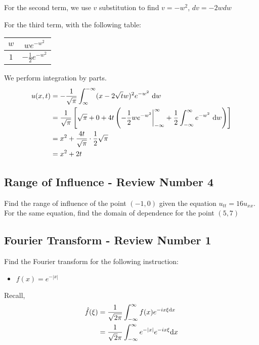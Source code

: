 For the second term, we use $v$ substitution to find $v = -w^2$, $dv = -2w dw$

For the third term, with the following table:
%
\begin{center}
  \begin{tabular}{c|c}
    $w$ & $we^{-w^2}$\\
    \hline
    $1$ & $-\frac{1}{2} e^{-w^2}$
  \end{tabular}
\end{center}

We perform integration by parts.
%
\begin{align}
  u(x, t) & = - \frac{1}{\sqrt \pi} \int^{-\infty}_{\infty} (x - 2 \sqrt t w)^2 e^{-w^2}\ \text dw\\
  & = \frac{1}{\sqrt \pi}
  \left[
  \sqrt \pi
  + 0
  + 4t
  \left(
  -\frac{1}{2} we^{-w^2} \bigg|^\infty_{-\infty} + \frac{1}{2} \int^\infty_{-\infty} e^{-w^2}\ \text dw
  \right)
  \right]\\
  & = x^2 + \frac{4t}{\sqrt \pi} \cdot \frac{1}{2} \sqrt \pi\\
  & = x^2 + 2t
\end{align}

\subsection*{Range of Influence - Review Number 4}

Find the range of influence of the point $(-1, 0)$ given the equation $u_{tt} = 16u_{xx}$. For the same equation, find the domain of dependence for the point $(5, 7)$

\subsection*{Fourier Transform - Review Number 1}

Find the Fourier transform for the following instruction:
%
\begin{itemize}
  \item $f(x) = e^{-|x|}$
\end{itemize}

Recall,
%
\begin{align}
  \hat f(\xi) & = \frac{1}{\sqrt{2\pi}} \int^\infty_{-\infty} f(x) e^{-i x \xi \text dx}\\
  & = \frac{1}{\sqrt 2 \pi} \int^\infty_{-\infty} e^{-|x|} e^{-i x \xi} \text dx
\end{align}

